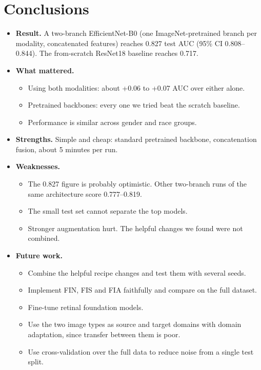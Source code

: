 \documentclass[11pt]{article}
\begin{document}
\section{Conclusions}
\begin{itemize}
\item \textbf{Result.} A two-branch EfficientNet-B0 (one ImageNet-pretrained branch per modality, concatenated features) reaches 0.827 test AUC (95\% CI 0.808--0.844). The from-scratch ResNet18 baseline reaches 0.717.
\item \textbf{What mattered.}
  \begin{itemize}
  \item Using both modalities: about +0.06 to +0.07 AUC over either alone.
  \item Pretrained backbones: every one we tried beat the scratch baseline.
  \item Performance is similar across gender and race groups.
  \end{itemize}
\item \textbf{Strengths.} Simple and cheap: standard pretrained backbone, concatenation fusion, about 5 minutes per run.
\item \textbf{Weaknesses.}
  \begin{itemize}
  \item The 0.827 figure is probably optimistic. Other two-branch runs of the same architecture score 0.777--0.819.
  \item The small test set cannot separate the top models.
  \item Stronger augmentation hurt. The helpful changes we found were not combined.
  \end{itemize}
\item \textbf{Future work.}
  \begin{itemize}
  \item Combine the helpful recipe changes and test them with several seeds.
  \item Implement FIN, FIS and FIA faithfully and compare on the full dataset.
  \item Fine-tune retinal foundation models.
  \item Use the two image types as source and target domains with domain adaptation, since transfer between them is poor.
  \item Use cross-validation over the full data to reduce noise from a single test split.
  \end{itemize}
\end{itemize}
\end{document}
